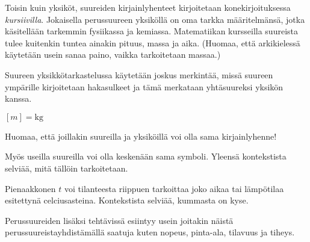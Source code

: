 Toisin kuin yksiköt, suureiden kirjainlyhenteet kirjoitetaan konekirjoituksessa \textit{kursiivilla}. Jokaisella perussuureen yksiköllä on oma tarkka määritelmänsä, jotka käsitellään tarkemmin fysiikassa ja kemiassa. Matematiikan kursseilla suureista tulee kuitenkin tuntea ainakin pituus, massa ja aika. (Huomaa, että arkikielessä käytetään usein sanaa paino, vaikka tarkoitetaan massaa.)

Suureen yksikkötarkastelussa käytetään joskus merkintää, missä suureen ympärille kirjoitetaan hakasulkeet ja tämä merkataan yhtäsuureksi yksikön kanssa.

\begin{esimerkki}
$[m]=\textrm{kg}$
\end{esimerkki}

Huomaa, että joillakin suureilla ja yksiköillä voi olla sama kirjainlyhenne!%

Myös useilla suureilla voi olla keskenään sama symboli. Yleensä kontekstista selviää, mitä tällöin tarkoitetaan.

\begin{esimerkki}
Pienaakkonen $t$ voi tilanteesta riippuen tarkoittaa joko aikaa tai lämpötilaa esitettynä celciusasteina. Kontekstista selviää, kummasta on kyse.
\end{esimerkki}

Perussuureiden lisäksi tehtävissä esiintyy usein joitakin näistä perussuureistayhdistämällä saatuja  kuten nopeus, pinta-ala, tilavuus ja tiheys.

